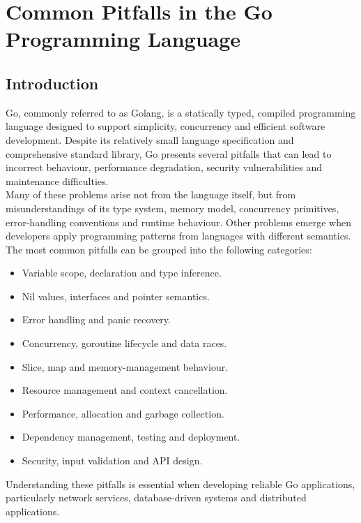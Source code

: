 \section{Common Pitfalls in the Go Programming Language}

\subsection{Introduction}

Go, commonly referred to as Golang, is a statically typed, compiled programming language designed to support simplicity, concurrency and efficient software development. Despite its relatively small language specification and comprehensive standard library, Go presents several pitfalls that can lead to incorrect behaviour, performance degradation, security vulnerabilities and maintenance difficulties.\\

Many of these problems arise not from the language itself, but from misunderstandings of its type system, memory model, concurrency primitives, error-handling conventions and runtime behaviour. Other problems emerge when developers apply programming patterns from languages with different semantics.\\

The most common pitfalls can be grouped into the following categories:

\begin{itemize}
    \item Variable scope, declaration and type inference.
    \item Nil values, interfaces and pointer semantics.
    \item Error handling and panic recovery.
    \item Concurrency, goroutine lifecycle and data races.
    \item Slice, map and memory-management behaviour.
    \item Resource management and context cancellation.
    \item Performance, allocation and garbage collection.
    \item Dependency management, testing and deployment.
    \item Security, input validation and API design.
\end{itemize}

Understanding these pitfalls is essential when developing reliable Go applications, particularly network services, database-driven systems and distributed applications.\\

